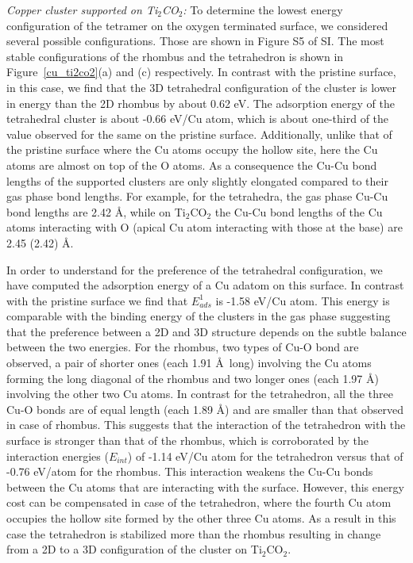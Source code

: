 \noindent \textit{Copper cluster supported on Ti$_2$CO$_2$:} To determine the lowest energy configuration
of the tetramer on the oxygen terminated surface, we considered several
possible configurations. Those are shown in Figure S5  of SI. The most
stable configurations of the rhombus and the tetrahedron is shown in
Figure~\ref{cu_ti2co2}(a) and (c) respectively. In contrast with the pristine surface,
in this case, we find that
the 3D tetrahedral configuration of the cluster is lower in energy
than the 2D rhombus by about 0.62 eV. The adsorption
energy of the tetrahedral cluster is about -0.66 eV/Cu atom, which
is about one-third of the value observed for the same on the pristine surface.
Additionally, unlike that of the pristine surface where the Cu atoms occupy
the hollow site, here the Cu atoms are almost on top of the O atoms. As a
consequence the Cu-Cu bond lengths of the supported clusters are only
slightly elongated compared to their gas phase bond lengths. For example,
for the tetrahedra, the gas phase Cu-Cu bond lengths are 2.42 \AA, while
on Ti$_2$CO$_2$ the Cu-Cu bond lengths of the Cu atoms interacting with O
(apical Cu atom interacting with those at the base) are 2.45 (2.42) \AA. 

In order to understand for the preference of the tetrahedral configuration,
we have computed the adsorption energy of a Cu adatom on this surface. In
contrast with the pristine surface we find that $E_{ads}^1$ is -1.58 eV/Cu atom.
This energy is comparable with the binding energy of the clusters in the
gas phase suggesting that the preference between a 2D and 3D structure depends
on the subtle balance between the two energies. For the rhombus, two
types of Cu-O bond are observed, a pair of shorter ones (each 1.91 \AA~long) involving the Cu atoms
forming the long diagonal of the rhombus and two longer ones (each 1.97 \AA) involving the other two Cu atoms. In contrast for the tetrahedron, all the three
Cu-O bonds are of equal length (each 1.89 \AA) and are smaller than that observed in case of rhombus. This suggests that the interaction of the tetrahedron
with the surface is stronger than that of the rhombus, which is corroborated by the interaction energies ($E_{int}$) of -1.14 eV/Cu atom for the tetrahedron versus that of -0.76 eV/atom for the rhombus. This interaction weakens the Cu-Cu bonds between the Cu atoms that are interacting with the surface. However, this energy cost can be compensated in case of the tetrahedron, where the fourth Cu atom occupies the hollow site formed by the other three Cu atoms. As a result in this case the tetrahedron is stabilized more than the rhombus resulting in change from a 2D to a 3D configuration of the cluster on Ti$_2$CO$_2$.


